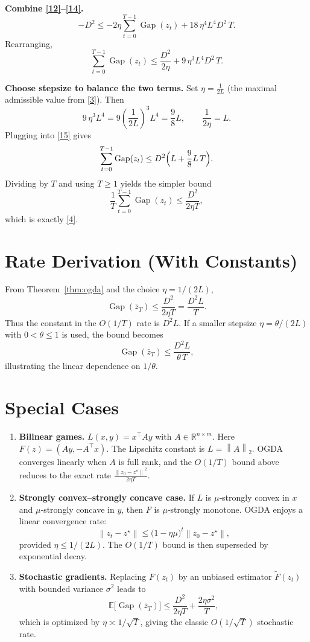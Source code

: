 \documentclass{article}
\newcommand{\E}{\mathbb{E}}
\newcommand{\R}{\mathbb{R}}
\newcommand{\norm}[1]{\left\lVert#1\right\rVert}
\newcommand{\gap}{\operatorname{Gap}}
\begin{document}
\begin{enumerate}[label={[Step \arabic*]}]
\item \textbf{Combine \eqref{12}–\eqref{14}.}
\[
- D^{2}\le
-2\eta\sum_{t=0}^{T-1}\gap(z_t)
+18\,\eta^{4}L^{4}D^{2}\,T .
\]
Rearranging,
\[
\sum_{t=0}^{T-1}\gap(z_t)
\le \frac{D^{2}}{2\eta}
+9\,\eta^{3}L^{4}D^{2}\,T .
\tag{15}
\]

\item \textbf{Choose stepsize to balance the two terms.}
Set $\eta = \frac{1}{2L}$ (the maximal admissible value from \eqref{3}). Then
\[
9\,\eta^{3}L^{4}=9\left(\frac{1}{2L}\right)^{3}L^{4}
= \frac{9}{8}L,
\qquad
\frac{1}{2\eta}=L .
\]
Plugging into \eqref{15} gives
\[
\sum_{t=0}^{T-1}\gap(z_t)
\le D^{2}\Bigl(L+\frac{9}{8}L\,T\Bigr).
\]
Dividing by $T$ and using $T\ge1$ yields the simpler bound
\[
\frac{1}{T}\sum_{t=0}^{T-1}\gap(z_t)
\le \frac{D^{2}}{2\eta T},
\]
which is exactly \eqref{4}. \qedhere
\end{enumerate}

\section*{Rate Derivation (With Constants)}
From Theorem~\ref{thm:ogda} and the choice $\eta=1/(2L)$,
\[
\gap(\bar z_T)\le\frac{D^{2}}{2\eta T}
= \frac{D^{2}L}{T}.
\]
Thus the constant in the $O(1/T)$ rate is $D^{2}L$.
If a smaller stepsize $\eta=\theta/(2L)$ with $0<\theta\le1$ is used, the bound becomes
\[
\gap(\bar z_T)\le \frac{D^{2}L}{\theta\,T},
\]
illustrating the linear dependence on $1/\theta$.

\section*{Special Cases}
\begin{enumerate}[label={\arabic*.}]
\item \textbf{Bilinear games.} $L(x,y)=x^{\top}Ay$ with $A\in\R^{n\times m}$. Here $F(z)=(Ay,-A^{\top}x)$. The Lipschitz constant is $L=\norm{A}_2$. OGDA converges linearly when $A$ is full rank, and the $O(1/T)$ bound above reduces to the exact rate $ \frac{\norm{z_0-z^\star}^{2}}{2\eta T}$.
\item \textbf{Strongly convex–strongly concave case.} If $L$ is $\mu$‑strongly convex in $x$ and $\mu$‑strongly concave in $y$, then $F$ is $\mu$‑strongly monotone. OGDA enjoys a linear convergence rate:
\[
\norm{z_t-z^\star}\le\bigl(1-\eta\mu\bigr)^{t}\norm{z_0-z^\star},
\]
provided $\eta\le 1/(2L)$. The $O(1/T)$ bound is then superseded by exponential decay.
\item \textbf{Stochastic gradients.} Replacing $F(z_t)$ by an unbiased estimator $\tilde F(z_t)$ with bounded variance $\sigma^{2}$ leads to
\[
\E\bigl[\gap(\bar z_T)\bigr]\le
\frac{D^{2}}{2\eta T}+ \frac{2\eta\sigma^{2}}{T},
\]
which is optimized by $\eta\asymp 1/\sqrt{T}$, giving the classic $O(1/\sqrt{T})$ stochastic rate.
\end{enumerate}
\end{document}
